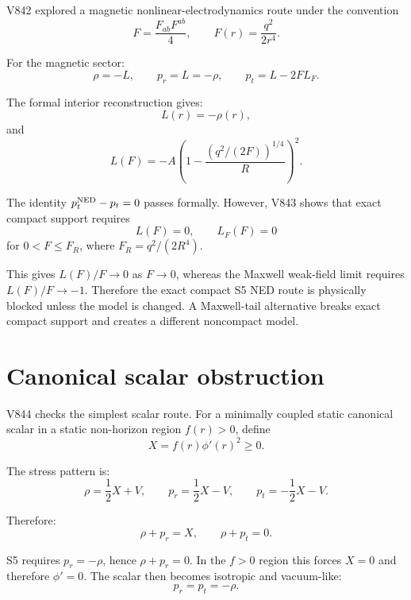 \documentclass[11pt,a4paper]{article}
\begin{document}
V842 explored a magnetic nonlinear-electrodynamics route under the convention
\begin{equation}
F=\frac{F_{ab}F^{ab}}{4},\qquad F(r)=\frac{q^2}{2r^4}.
\end{equation}

For the magnetic sector:
\begin{equation}
\rho=-L,\qquad p_r=L=-\rho,\qquad p_t=L-2F L_F.
\end{equation}

The formal interior reconstruction gives:
\begin{equation}
L(r)=-\rho(r),
\end{equation}
and
\begin{equation}
L(F)=-A\left(1-\frac{(q^2/(2F))^{1/4}}{R}\right)^2.
\end{equation}

The identity $p_t^{\rm NED}-p_t=0$ passes formally. However, V843 shows that exact compact support requires
\begin{equation}
L(F)=0,\qquad L_F(F)=0
\end{equation}
for $0<F\le F_R$, where $F_R=q^2/(2R^4)$.

This gives $L(F)/F\to 0$ as $F\to 0$, whereas the Maxwell weak-field limit requires $L(F)/F\to -1$. Therefore the exact compact S5 NED route is physically blocked unless the model is changed. A Maxwell-tail alternative breaks exact compact support and creates a different noncompact model.

\section{Canonical scalar obstruction}

V844 checks the simplest scalar route. For a minimally coupled static canonical scalar in a static non-horizon region $f(r)>0$, define
\begin{equation}
X=f(r)\phi'(r)^2\ge 0.
\end{equation}

The stress pattern is:
\begin{equation}
\rho=\frac{1}{2}X+V,\qquad p_r=\frac{1}{2}X-V,\qquad p_t=-\frac{1}{2}X-V.
\end{equation}

Therefore:
\begin{equation}
\rho+p_r=X,\qquad \rho+p_t=0.
\end{equation}

S5 requires $p_r=-\rho$, hence $\rho+p_r=0$. In the $f>0$ region this forces $X=0$ and therefore $\phi'=0$. The scalar then becomes isotropic and vacuum-like:
\begin{equation}
p_r=p_t=-\rho.
\end{equation}
\end{document}
